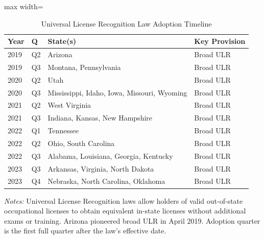 \begin{table}[H]
\centering
\caption{Universal License Recognition Law Adoption Timeline}
\label{tab:ulr}
\begin{adjustbox}{max width=\textwidth}
\begin{tabular}{llll}
\toprule
Year & Q & State(s) & Key Provision \\
\midrule
2019 & Q2 & Arizona & Broad ULR \\
2019 & Q3 & Montana, Pennsylvania & Broad ULR \\
2020 & Q2 & Utah & Broad ULR \\
2020 & Q3 & Mississippi, Idaho, Iowa, Missouri, Wyoming & Broad ULR \\
2021 & Q2 & West Virginia & Broad ULR \\
2021 & Q3 & Indiana, Kansas, New Hampshire & Broad ULR \\
2022 & Q1 & Tennessee & Broad ULR \\
2022 & Q2 & Ohio, South Carolina & Broad ULR \\
2022 & Q3 & Alabama, Louisiana, Georgia, Kentucky & Broad ULR \\
2023 & Q3 & Arkansas, Virginia, North Dakota & Broad ULR \\
2023 & Q4 & Nebraska, North Carolina, Oklahoma & Broad ULR \\
\bottomrule
\end{tabular}
\end{adjustbox}

\vspace{0.5em}
{\small \emph{Notes:} Universal License Recognition laws allow holders of valid out-of-state occupational licenses to obtain equivalent in-state licenses without additional exams or training. Arizona pioneered broad ULR in April 2019. Adoption quarter is the first full quarter after the law's effective date.}
\end{table}

